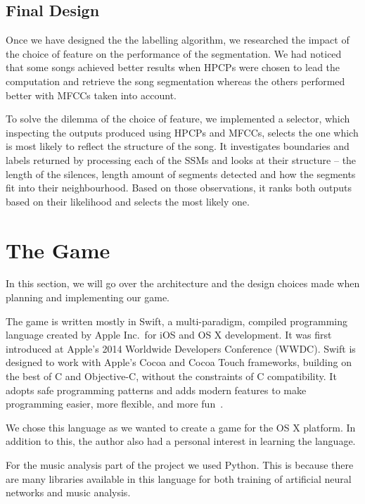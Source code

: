 \subsection{Final Design}

Once we have designed the the labelling algorithm, we researched the impact of the choice of feature on the performance of the segmentation. We had noticed that some songs achieved better results when HPCPs were chosen to lead the computation and retrieve the song segmentation whereas the others performed better with MFCCs taken into account. 

To solve the dilemma of the choice of feature, we implemented a selector, which inspecting the outputs produced using HPCPs and MFCCs, selects the one which is most likely to reflect the structure of the song. It investigates boundaries and labels returned by processing each of the SSMs and looks at their structure -- the length of the silences, length amount of segments detected and how the segments fit into their neighbourhood. Based on those observations, it ranks both outputs based on their likelihood and selects the most likely one. 

\vspace{20pt}
\newpage

\section{The Game}

In this section, we will go over the architecture and the design choices made when planning and implementing our game.

The game is written mostly in Swift, a multi-paradigm, compiled programming language created by Apple Inc.\ for iOS and OS X development. 
It was first introduced at Apple's 2014 Worldwide Developers Conference (WWDC). Swift is designed to work with Apple's Cocoa and Cocoa Touch frameworks, building on the best of C and Objective-C, without the constraints of C compatibility. It adopts safe programming patterns and adds modern features to make programming easier, more flexible, and more fun~\cite{swiftintro}. 

We chose this language as we wanted to create a game for the OS X platform. In addition to this, the author also had a personal interest in learning the language.

For the music analysis part of the project we used Python. This is because there are many libraries available in this language for both training of artificial neural networks and music analysis. 

